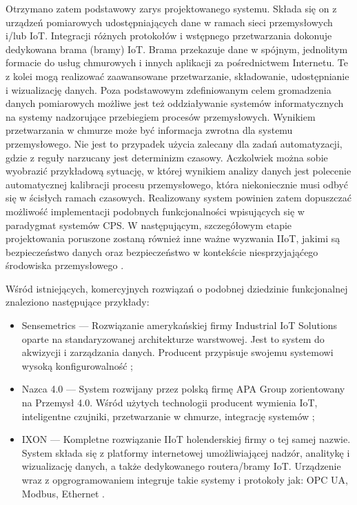 \documentclass[a4paper, 12pt, twoside]{article}
\begin{document}
Otrzymano zatem podstawowy zarys projektowanego systemu. 
Składa się on z urządzeń pomiarowych udostępniających dane w ramach sieci 
przemysłowych i/lub IoT. Integracji różnych protokołów i wstępnego przetwarzania
dokonuje dedykowana brama (bramy) IoT. Brama przekazuje dane w spójnym, jednolitym
formacie do usług chmurowych i innych aplikacji za pośrednictwem Internetu.
Te z kolei mogą realizować zaawansowane przetwarzanie, składowanie, udostępnianie
i wizualizację danych. Poza podstawowym zdefiniowanym celem gromadzenia danych pomiarowych
możliwe jest też oddziaływanie systemów informatycznych na systemy nadzorujące 
przebiegiem procesów przemysłowych. Wynikiem przetwarzania w chmurze może
być informacja zwrotna dla systemu przemysłowego. Nie jest to przypadek użycia
zalecany dla zadań automatyzacji, gdzie z reguły narzucany jest determinizm czasowy. 
Aczkolwiek można sobie wyobrazić przykładową sytuację, w której wynikiem analizy danych jest 
polecenie automatycznej kalibracji procesu przemysłowego, która niekoniecznie musi
odbyć się w ścisłych ramach czasowych. Realizowany system powinien zatem dopuszczać
możliwość implementacji podobnych funkcjonalności wpisujących się w paradygmat
systemów CPS. W następującym, szczegółowym etapie projektowania poruszone zostaną również 
inne ważne wyzwania IIoT, jakimi są bezpieczeństwo danych oraz bezpieczeństwo w kontekście niesprzyjająćego
środowiska przemysłowego \cite{iiot-challenges-opportunities-directions}.

Wśród istniejących, komercyjnych rozwiązań o podobnej dziedzinie funkcjonalnej
znaleziono następujące przykłady:
\begin{itemize}
    \itemsep0em 
    \item Sensemetrics --- Rozwiązanie amerykańskiej firmy Industrial IoT Solutions
    oparte na standaryzowanej architekturze warstwowej. Jest to system do akwizycji
    i zarządzania danych. Producent przypisuje swojemu systemowi wysoką konfigurowalność \cite{sensmetrics};
    \item Nazca 4.0 --- System rozwijany przez polską firmę APA Group zorientowany na Przemysł 4.0.
    Wśród użytych technologii producent wymienia IoT, inteligentne czujniki, 
    przetwarzanie w chmurze, integrację systemów \cite{nazca};
    \item IXON --- Kompletne rozwiązanie IIoT holenderskiej firmy o tej samej nazwie.
    System składa się z platformy internetowej umożliwiającej nadzór, analitykę i wizualizację danych,
    a także dedykowanego routera/bramy IoT. Urządzenie wraz z opgrogramowaniem
    integruje takie systemy i protokoły jak: OPC UA, Modbus, Ethernet \cite{ixon}.
\end{itemize}
\end{document}
